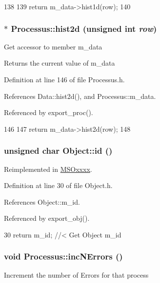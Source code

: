 \begin{DoxyCode}
138                                    {
139     return m_data->hist1d(row);
140   }
\end{DoxyCode}
\hypertarget{classProcessus_a73b5118cb5f2b5eaad33286183b86cfc}{
\subsubsection[{hist2d}]{$\ast$ Processus::hist2d (unsigned int {\em row})}}
\label{classProcessus_a73b5118cb5f2b5eaad33286183b86cfc}
Get accessor to member m\_\-data \begin{DoxyReturn}{Returns}
the current value of m\_\-data 
\end{DoxyReturn}


Definition at line 146 of file Processus.h.

References Data::hist2d(), and Processus::m\_\-data.

Referenced by export\_\-proc().


\begin{DoxyCode}
146                                    {
147     return m_data->hist2d(row);
148   }
\end{DoxyCode}
\hypertarget{classObject_af99145335cc61ff6e2798ea17db009d2}{
\subsubsection[{id}]{\setlength{\rightskip}{0pt plus 5cm}unsigned char Object::id ()}}
\label{classObject_af99145335cc61ff6e2798ea17db009d2}


Reimplemented in \hyperlink{classMSOxxxx_a0f14b23d31d8e7647184e99a89600cc3}{MSOxxxx}.

Definition at line 30 of file Object.h.

References Object::m\_\-id.

Referenced by export\_\-obj().


\begin{DoxyCode}
30 { return m_id;         } //< Get Object m_id 
\end{DoxyCode}
\hypertarget{classProcessus_abe603d0636f76db6aa6c5c60cf34c591}{
\subsubsection[{incNErrors}]{\setlength{\rightskip}{0pt plus 5cm}void Processus::incNErrors ()}}
\label{classProcessus_abe603d0636f76db6aa6c5c60cf34c591}
Increment the number of Errors for that process 

